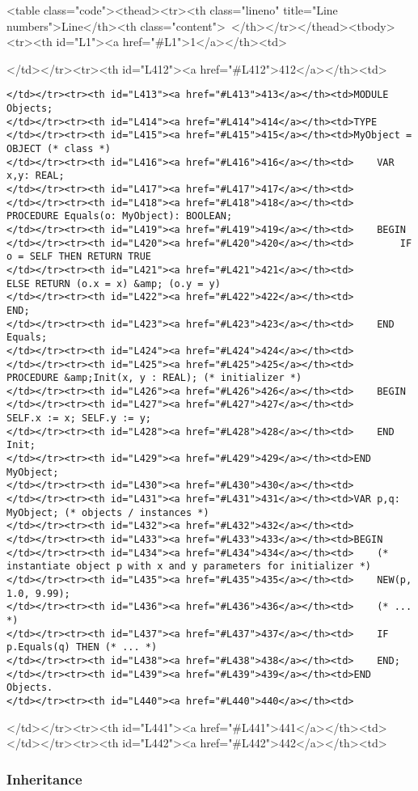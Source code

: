 <table class="code"><thead><tr><th class="lineno" title="Line numbers">Line</th><th class="content"> </th></tr></thead><tbody><tr><th id="L1"><a href="#L1">1</a></th><td>\documentclass[a4paper,11pt]{article}
\begin{document}
</td></tr><tr><th id="L412"><a href="#L412">412</a></th><td>\begin{lstlisting}[language=Oberon,frame=none,caption=Usage of Objects]
</td></tr><tr><th id="L413"><a href="#L413">413</a></th><td>MODULE Objects;
</td></tr><tr><th id="L414"><a href="#L414">414</a></th><td>TYPE
</td></tr><tr><th id="L415"><a href="#L415">415</a></th><td>MyObject = OBJECT (* class *)
</td></tr><tr><th id="L416"><a href="#L416">416</a></th><td>    VAR x,y: REAL;
</td></tr><tr><th id="L417"><a href="#L417">417</a></th><td>
</td></tr><tr><th id="L418"><a href="#L418">418</a></th><td>    PROCEDURE Equals(o: MyObject): BOOLEAN;
</td></tr><tr><th id="L419"><a href="#L419">419</a></th><td>    BEGIN
</td></tr><tr><th id="L420"><a href="#L420">420</a></th><td>        IF o = SELF THEN RETURN TRUE
</td></tr><tr><th id="L421"><a href="#L421">421</a></th><td>        ELSE RETURN (o.x = x) &amp; (o.y = y)
</td></tr><tr><th id="L422"><a href="#L422">422</a></th><td>        END;
</td></tr><tr><th id="L423"><a href="#L423">423</a></th><td>    END Equals;
</td></tr><tr><th id="L424"><a href="#L424">424</a></th><td>
</td></tr><tr><th id="L425"><a href="#L425">425</a></th><td>    PROCEDURE &amp;Init(x, y : REAL); (* initializer *)
</td></tr><tr><th id="L426"><a href="#L426">426</a></th><td>    BEGIN
</td></tr><tr><th id="L427"><a href="#L427">427</a></th><td>        SELF.x := x; SELF.y := y;
</td></tr><tr><th id="L428"><a href="#L428">428</a></th><td>    END Init;
</td></tr><tr><th id="L429"><a href="#L429">429</a></th><td>END MyObject;
</td></tr><tr><th id="L430"><a href="#L430">430</a></th><td>
</td></tr><tr><th id="L431"><a href="#L431">431</a></th><td>VAR p,q: MyObject; (* objects / instances *)
</td></tr><tr><th id="L432"><a href="#L432">432</a></th><td>
</td></tr><tr><th id="L433"><a href="#L433">433</a></th><td>BEGIN
</td></tr><tr><th id="L434"><a href="#L434">434</a></th><td>    (* instantiate object p with x and y parameters for initializer *)
</td></tr><tr><th id="L435"><a href="#L435">435</a></th><td>    NEW(p, 1.0, 9.99);
</td></tr><tr><th id="L436"><a href="#L436">436</a></th><td>    (* ... *)
</td></tr><tr><th id="L437"><a href="#L437">437</a></th><td>    IF p.Equals(q) THEN (* ... *)
</td></tr><tr><th id="L438"><a href="#L438">438</a></th><td>    END;
</td></tr><tr><th id="L439"><a href="#L439">439</a></th><td>END Objects.
</td></tr><tr><th id="L440"><a href="#L440">440</a></th><td>\end{lstlisting}
</td></tr><tr><th id="L441"><a href="#L441">441</a></th><td>
</td></tr><tr><th id="L442"><a href="#L442">442</a></th><td>\subsubsection{Inheritance}
\end{document}

